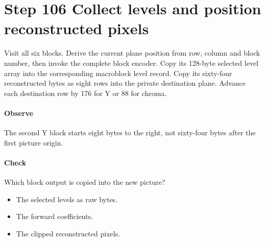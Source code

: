 \section{Step 106 Collect levels and position reconstructed pixels}\label{h263-picture-s06}
Visit all six blocks. Derive the current plane position from row, column and
block number, then invoke the complete block encoder. Copy its 128-byte selected
level array into the corresponding macroblock level record. Copy its sixty-four
reconstructed bytes as eight rows into the private destination plane. Advance
each destination row by 176 for Y or 88 for chroma.

\paragraph{Observe} The second Y block starts eight bytes to the right, not sixty-four bytes after the first picture origin.
\paragraph{Check} Which block output is copied into the new picture?
\begin{itemize}
  \item[A.] The selected levels as raw bytes.
  \item[B.] The forward coefficients.
  \item[C.] The clipped reconstructed pixels.
\end{itemize}
